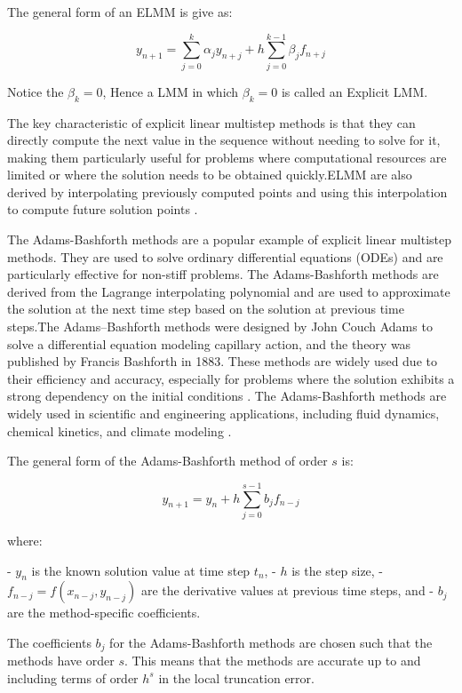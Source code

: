 The general form of an ELMM is give as:

\begin{equation}
  y_{n+1} = \sum_{j=0}^{k} \alpha_j y_{n+j} + h \sum_{j=0}^{k-1} \beta_j f_{n+j}
\end{equation}

Notice the $\beta_k = 0$, Hence a LMM in which $\beta_k = 0$ is called an Explicit LMM.

The key characteristic of explicit linear multistep methods is that they can directly compute the next value in the sequence without needing to solve for it, making them particularly useful for problems where computational resources are limited or where the solution needs to be obtained quickly.ELMM are also derived by  interpolating previously computed points and using this interpolation to compute future solution points \cite{Alexanderian2022}.

The Adams-Bashforth methods are a popular example of explicit linear multistep methods. They are used to solve ordinary differential equations (ODEs) and are particularly effective for non-stiff problems. The Adams-Bashforth methods are derived from the Lagrange interpolating polynomial and are used to approximate the solution at the next time step based on the solution at previous time steps.The Adams–Bashforth methods were designed by John Couch Adams to solve a differential equation modeling capillary action, and the theory was published by Francis Bashforth in 1883. These methods are widely used due to their efficiency and accuracy, especially for problems where the solution exhibits a strong dependency on the initial conditions \cite{enwiki:1166346639}. The Adams-Bashforth methods are widely used in scientific and engineering applications, including fluid dynamics, chemical kinetics, and climate modeling \cite{wong2020lecture}.

The general form of the Adams-Bashforth method of order $s$ is:

\begin{equation}
  y_{n+1} = y_n + h \sum_{j=0}^{s-1} b_j f_{n-j}
\end{equation}


where:

- $y_n$ is the known solution value at time step $t_n$,
- $h$ is the step size,
- $f_{n-j} = f(x_{n-j}, y_{n-j})$ are the derivative values at previous time steps, and
- $b_j$ are the method-specific coefficients.

The coefficients $b_j$ for the Adams-Bashforth methods are chosen such that the methods have order $s$. This means that the methods are accurate up to and including terms of order $h^s$ in the local truncation error.

